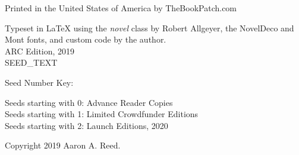 \thispagestyle{empty}

\NewFontFamily{}
\vspace*{6\nbs}
\begin{center}
{\mont {}}
\end{center}
\clearpage

\thispagestyle{empty}
\null %
\clearpage

\thispagestyle{empty}
\vspace*{6\nbs}
\begin{center}
{\mont {}}

\vspace*{3\nbs}

{\mont {}}

\vfill
Printed in the United States of America by TheBookPatch.com

\end{center}
\clearpage

\thispagestyle{empty}
\null\vfill

\begin{legalese}
Typeset in LaTeX using the \textit{novel} class by Robert Allgeyer, the NovelDeco and Mont fonts, and custom code by the author. \\
\vspace{1\nbs}
ARC Edition, 2019 \\
\vspace{1\nbs}
SEED_TEXT \\

\vspace{1\nbs}

\begin{parascale}[0.88]
Seed Number Key: \\
\begin{adjustwidth}{2em}{2em}
Seeds starting with 0: Advance Reader Copies \\
Seeds starting with 1: Limited Crowdfunder Editions \\
Seeds starting with 2: Launch Editions, 2020
\end{adjustwidth}
\end{parascale}
\vspace{1\nbs}

Copyright 2019 Aaron A. Reed.
\end{legalese}
\clearpage

